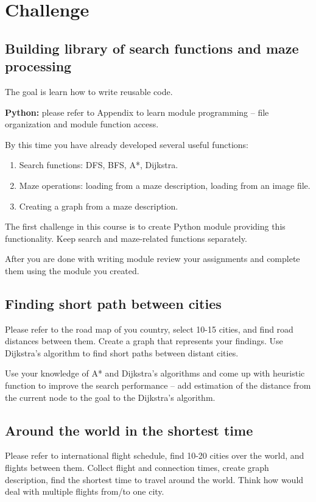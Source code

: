 \section{Challenge} 
\subsection{Building library of search functions and maze processing}
The goal is learn how to write reusable code.

\begin{tcolorbox}
\textbf{Python:} please refer to Appendix to learn
module programming -- file organization and module function access.
\end{tcolorbox}

By this time you have already developed several useful functions:
\begin{enumerate}
\item Search functions: DFS, BFS, A*, Dijkstra.
\item Maze operations: loading from a maze description, loading from an image file.
\item Creating a graph from a maze description.
\end{enumerate}

The first challenge in this course is to create Python module providing
this functionality. Keep search and maze-related functions separately.

After you are done with writing module review your assignments 
and complete them using the module you created.

\subsection{Finding short path between cities}

Please refer to the road map of you country, select 10-15 cities, and
find road distances between them. Create a graph that represents your
findings. Use Dijkstra's algorithm to find short paths between distant
cities.

Use your knowledge of A* and Dijkstra's algorithms and come up with
heuristic function to improve the search performance -- add estimation
of the distance from the current node to the goal 
to the Dijkstra's algorithm.

\subsection{Around the world in the shortest time}

Please refer to international flight schedule, find 10-20 cities
over the world, and flights between them. Collect flight and connection
times, create graph description, find the shortest time to travel
around the world. Think how would deal with multiple flights from/to
one city.












